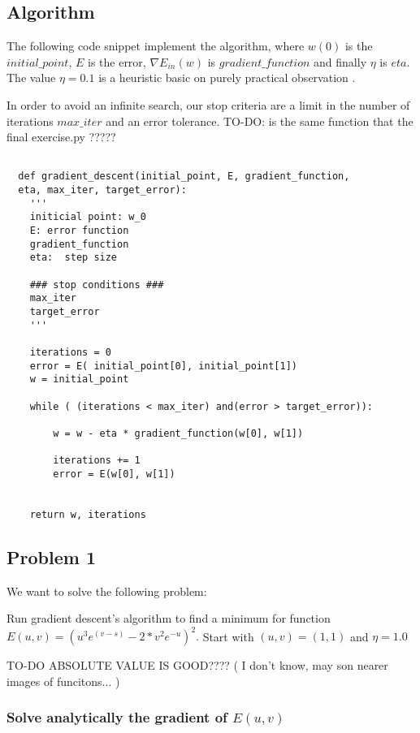 \subsection{Algorithm}

The following code snippet implement the algorithm, where $w(0)$ is the $initial\_point$, $E$ is the error, $\nabla E_{in}(w)$ is $gradient\_function$ and
finally $\eta$ is $eta.$ The value $\eta = 0.1$ is a heuristic basic on purely practical observation \cite{LFD}.


In order to avoid an infinite search, our stop criteria are a limit in the number of iterations $max\_iter$ and an error tolerance. 
TO-DO: is the same function that the final exercise.py ?????
\begin{verbatim} 

  def gradient_descent(initial_point, E, gradient_function,
  eta, max_iter, target_error):
    '''
    initicial point: w_0 
    E: error function 
    gradient_function
    eta:  step size 

    ### stop conditions ###
    max_iter
    target_error
    '''

    iterations = 0
    error = E( initial_point[0], initial_point[1])
    w = initial_point
  
    while ( (iterations < max_iter) and(error > target_error)): 

        w = w - eta * gradient_function(w[0], w[1])
        
        iterations += 1
        error = E(w[0], w[1])
 
    
    return w, iterations

\end{verbatim}

\subsection{Problem 1}

We want to solve the following problem: %

Run gradient descent's algorithm to find a minimum for
function $E(u,v) = (u^3 e^{(v-s)} - 2* v^2 e^{-u})^2.$
Start with $(u,v)=(1,1)$ and $\eta = 1.0$

TO-DO ABSOLUTE VALUE IS GOOD???? ( I don't know, may son nearer images of  funcitons... )
\subsubsection{Solve analytically the gradient of $E(u,v)$}


